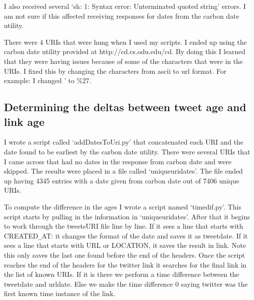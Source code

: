 \documentclass[12pt]{report}
\begin{document}
I also received several `sh: 1: Syntax error: Unterminated quoted string' errors.  I am not sure if this affected receiving responses for dates from the carbon date utility.

There were 4 URIs that were hung when I used my scripts.  I ended up using the carbon date utility provided at http://cd.cs.odu.edu/cd.  By doing this I learned that they were having issues because of some of the characters that were in the URIs.  I fixed this by changing the characters from ascii to url format.  For example: I changed ' to \%27.

\subsection*{Determining the deltas between tweet age and link age}

I wrote a script called `addDatesToUri.py' that concatenated each URI and the date found to be earliest by the carbon date utility.  There were several URIs that I came across that had no dates in the response from carbon date and were skipped. The results were placed in a file called `uniqueuridates'.  The file ended up having 4345 entries with a date given from carbon date out of 7406 unique URIs.

To compute the difference in the ages I wrote a script named `timedif.py'.  This script starts by pulling in the information in `uniqueuridates'.  After that it begins to work through the tweetsURI file line by line.  If it sees a line that starts with CREATED\texttt{\_}AT: it changes the format of the date and saves it as tweetdate.  If it sees a line that starts with URL or LOCATION, it saves the result in link. Note this only saves the last one found before the end of the headers.  Once the script reaches the end of the headers for the twitter link it searches for the final link in the list of known URIs.  If it is there we perform a time difference between the tweetdate and urldate.  Else we make the time difference 0 saying twitter was the first known time instance of the link.
\end{document}
